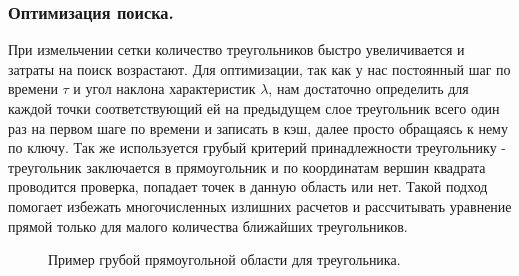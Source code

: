 \documentclass[14pt]{article}
\begin{document}
\subsubsection{Оптимизация поиска.}
При измельчении сетки количество треугольников быстро увеличивается и затраты на поиск возрастают. Для оптимизации, так как у нас постоянный шаг по времени $\tau$ и угол наклона характеристик $\lambda$, нам достаточно определить для каждой точки соответствующий ей на предыдущем слое треугольник всего один раз на первом шаге по времени и записать в кэш, далее просто обращаясь к нему по ключу. Так же используется грубый критерий принадлежности треугольнику - треугольник заключается в прямоугольник и по координатам вершин квадрата проводится проверка, попадает точек в данную область или нет. Такой подход помогает избежать многочисленных излишних расчетов и рассчитывать уравнение прямой только для малого количества ближайших треугольников. 
\begin{figure}[!h!]
\caption{Пример грубой прямоугольной области для треугольника.}
\end{figure}
\end{document}
